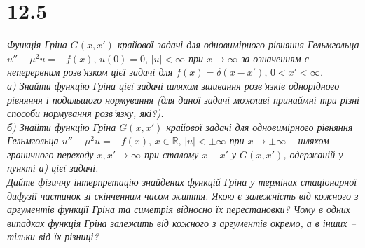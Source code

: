


%


\section[Задача №12.5]{12.5}

\textit{Функція Гріна $G(x,x')$ крайової задачі для одновимірного рівняння Гельмгольца $u'' - \mu^2u = -f(x), \, u(0) = 0, \, |u| < \infty $ при $x \to \infty$ за означенням є неперервним розв’язком цієї задачі для $f(x) = \delta(x-x'), \, 0 < x' < \infty$.\\
а) Знайти функцію Гріна цієї задачі шляхом зшивання розв’язків однорідного рівняння і подальшого нормування (для даної задачі можливі принаймні три різні способи нормування розв’язку, які?).\\
б) Знайти функцію Гріна $G(x,x')$ крайової задачі для одновимірного рівняння Гельмгольца $u'' - \mu^2u = -f(x), \, x \in \mathbb{R}, \, |u| < \pm\infty $ при $x \to \pm\infty$ – шляхом граничного переходу $x, x' \to \infty$ при сталому $x-x'$ у $G(x,x')$, одержаній у пункті а) цієї задачі.\\
Дайте фізичну інтерпретацію знайдених функцій Гріна у термінах стаціонарної дифузії частинок зі скінченним часом життя. Якою є залежність від кожного з аргументів функції Гріна та симетрія відносно їх перестановки? Чому в одних випадках функція Гріна залежить від кожного з аргументів окремо, а в інших – тільки від їх різниці?}


%